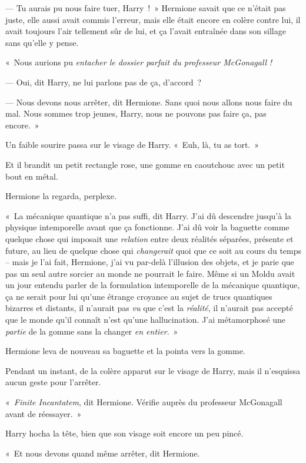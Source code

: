 --- Tu aurais pu nous faire tuer, Harry~!~»
Hermione savait que ce n'était pas juste, elle aussi avait commis l'erreur, mais elle était encore en colère contre lui, il avait toujours l'air tellement sûr de lui, et ça l'avait entraînée dans son sillage sans qu'elle y pense.

«~Nous aurions pu \emph{entacher le dossier parfait du professeur McGonagall} \emph{!}

--- Oui, dit Harry, ne lui parlons pas de ça, d'accord~?

--- Nous devons nous arrêter, dit Hermione.
Sans quoi nous allons nous faire du mal.
Nous sommes trop jeunes, Harry, nous ne pouvons pas faire ça, pas encore.~»

Un faible sourire passa sur le visage de Harry.
«~Euh, là, tu as tort.~»

Et il brandit un petit rectangle rose, une gomme en caoutchouc avec un petit bout en métal.

Hermione la regarda, perplexe.

«~La mécanique quantique n'a pas suffi, dit Harry.
J'ai dû descendre jusqu'à la physique intemporelle avant que ça fonctionne.
J'ai dû voir la baguette comme quelque chose qui imposait une \emph{relation} entre deux réalités séparées, présente et future, au lieu de quelque chose qui \emph{changerait} quoi que ce soit au cours du temps -- mais je l'ai fait, Hermione, j'ai vu par-delà l'illusion des objets, et je parie que pas un seul autre sorcier au monde ne pourrait le faire.
Même si un Moldu avait un jour entendu parler de la formulation intemporelle de la mécanique quantique, ça ne serait pour lui qu'une étrange croyance au sujet de trucs quantiques bizarres et distants, il n'aurait pas \emph{vu} que c'est la \emph{réalité}, il n'aurait pas accepté que le monde qu'il connaît n'est qu'une hallucination.
J'ai métamorphosé une \emph{partie} de la gomme sans la changer \emph{en entier}.~»

Hermione leva de nouveau sa baguette et la pointa vers la gomme.

Pendant un instant, de la colère apparut sur le visage de Harry, mais il n'esquissa aucun geste pour l'arrêter.

«~\emph{Finite Incantatem}, dit Hermione.
Vérifie auprès du professeur McGonagall avant de réessayer.~»

Harry hocha la tête, bien que son visage soit encore un peu pincé.

«~Et nous devons quand même arrêter, dit Hermione.

